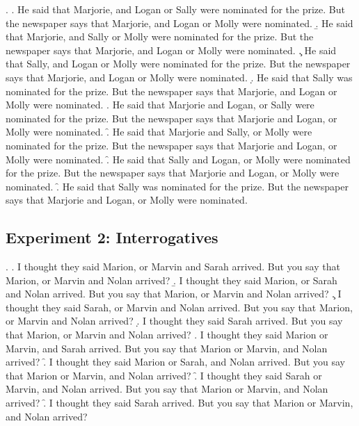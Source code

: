 \documentclass[preprint,review,12pt,authoryear,times]{elsarticle}
\begin{document}
\ex. 
\a. He said that Marjorie, and Logan or Sally were nominated for the prize. But the newspaper says that Marjorie, and Logan or Molly were nominated.  
\b. He said that Marjorie, and Sally or Molly were nominated for the prize. But the newspaper says that Marjorie, and Logan or Molly were nominated.
\c. He said that Sally, and Logan or Molly were nominated for the prize. But the newspaper says that Marjorie, and Logan or Molly were nominated.
\d. He said that Sally was nominated for the prize. But the newspaper says that Marjorie, and Logan or Molly were nominated.
\e. He said that Marjorie and Logan, or Sally were nominated for the prize. But the newspaper says that  Marjorie and Logan, or Molly were nominated.
\f. He said that Marjorie and Sally, or Molly were nominated for the prize. But the newspaper says that  Marjorie and Logan, or Molly were nominated.
\f. He said that Sally and Logan, or Molly were nominated for the prize. But the newspaper says that  Marjorie and Logan, or Molly were nominated.
\f. He said that Sally was nominated for the prize. But the newspaper says that  Marjorie and Logan, or Molly were nominated.


\subsection*{Experiment 2: Interrogatives}

\setcounter{ExNo}{0}

\ex. 
\a. I thought they said Marion, or Marvin and Sarah arrived. But you say that Marion, or Marvin and Nolan arrived?
\b. I thought they said Marion, or Sarah and Nolan arrived. But you say that Marion, or Marvin and Nolan arrived?
\c. I thought they said Sarah, or Marvin and Nolan arrived. But you say that Marion, or Marvin and Nolan arrived?
\d. I thought they said Sarah arrived. But you say that Marion, or Marvin and Nolan arrived?
\e. I thought they said Marion or Marvin, and Sarah arrived. But you say that Marion or Marvin, and Nolan arrived?
\f. I thought they said Marion or Sarah, and Nolan arrived. But you say that Marion or Marvin, and Nolan arrived?
\f. I thought they said Sarah or Marvin, and Nolan arrived. But you say that Marion or Marvin, and Nolan arrived?
\f. I thought they said Sarah arrived. But you say that Marion or Marvin, and Nolan arrived?
\end{document}
